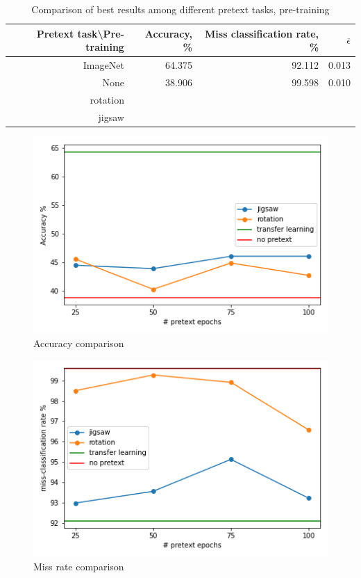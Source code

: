 \begin{table}[h]
    \begin{tabular}{|r|r|r|r|}
        \hline
        Pretext task\textbackslash Pre-training & Accuracy, \% & Miss classification rate, \% & $\overline{\epsilon}$ \\
        \hline
        ImageNet                                & 64.375       & 92.112                       & 0.013                 \\
        None                                    & 38.906       & 99.598                       & 0.010                 \\
        rotation                                &              &                              &                       \\
        jigsaw                                  &              &                              &                       \\
        \hline
    \end{tabular}
    \caption{\label{tab:table-3}Comparison of best results among different pretext tasks, pre-training}
\end{table}

\begin{figure}
    \includegraphics{images/acc}
    \caption{\label{fig:figure-1}Accuracy comparison}
\end{figure}

\begin{figure}
    \includegraphics{images/miss_rate}
    \caption{\label{fig:figure-2}Miss rate comparison}
\end{figure}

